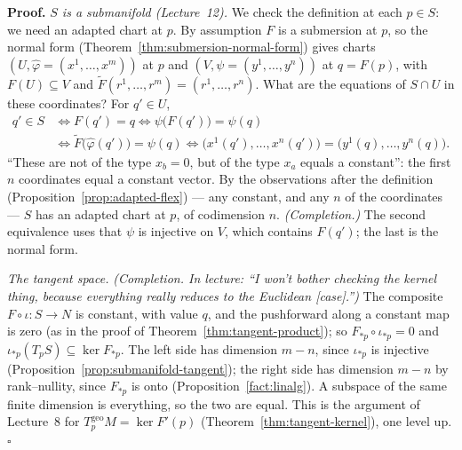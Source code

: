 \documentclass[11pt]{report}
\renewenvironment{proof}[1][Proof]{\noindent\textbf{#1.} }{\hfill$\square$\par\vspace{5pt}}
\newcommand{\geo}{\mathrm{geo}}
\begin{document}
\begin{proof}
\emph{$S$ is a submanifold (Lecture~12).} We check the definition at each $p \in S$: we need an adapted chart at $p$. By assumption $F$ is a submersion at $p$, so the normal form (Theorem~\ref{thm:submersion-normal-form}) gives charts $(U, \hat\varphi = (x^1, \ldots, x^m))$ at $p$ and $(V, \psi = (y^1, \ldots, y^n))$ at $q = F(p)$, with $F(U) \subseteq V$ and $\tilde F(r^1, \ldots, r^m) = (r^1, \ldots, r^n)$. What are the equations of $S \cap U$ in these coordinates? For $q' \in U$,
\begin{align*}
q' \in S &\iff F(q') = q \iff \psi\big(F(q')\big) = \psi(q) \\
&\iff \tilde F\big(\hat\varphi(q')\big) = \psi(q) \iff \big(x^1(q'), \ldots, x^n(q')\big) = \big(y^1(q), \ldots, y^n(q)\big).
\end{align*}
``These are not of the type $x_b = 0$, but of the type $x_a$ equals a constant'': the first $n$ coordinates equal a constant vector. By the observations after the definition (Proposition~\ref{prop:adapted-flex}) --- any constant, and any $n$ of the coordinates --- $S$ has an adapted chart at $p$, of codimension $n$. \textit{(Completion.)} The second equivalence uses that $\psi$ is injective on $V$, which contains $F(q')$; the last is the normal form.

\emph{The tangent space.} \textit{(Completion. In lecture: ``I won't bother checking the kernel thing, because everything really reduces to the Euclidean [case].'')} The composite $F \circ \iota : S \to N$ is constant, with value $q$, and the pushforward along a constant map is zero (as in the proof of Theorem~\ref{thm:tangent-product}); so $F_{*p} \circ \iota_{*p} = 0$ and $\iota_{*p}(T_pS) \subseteq \ker F_{*p}$. The left side has dimension $m - n$, since $\iota_{*p}$ is injective (Proposition~\ref{prop:submanifold-tangent}); the right side has dimension $m - n$ by rank--nullity, since $F_{*p}$ is onto (Proposition~\ref{fact:linalg}). A subspace of the same finite dimension is everything, so the two are equal. This is the argument of Lecture~8 for $T^{\geo}_pM = \ker F'(p)$ (Theorem~\ref{thm:tangent-kernel}), one level up.
\end{proof}

\begin{center}
\end{center}
\end{document}
